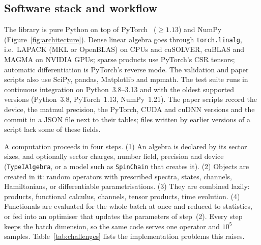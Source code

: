 \documentclass[11pt]{article}
\begin{document}
\subsection{Software stack and workflow}\label{sec:stack}

The library is pure Python on top of PyTorch~\cite{paszke2019} ($\ge1.13$) and NumPy~\cite{harris2020}
(Figure~\ref{fig:architecture}). Dense linear algebra goes through \texttt{torch.linalg}, i.e.\ LAPACK (MKL or
OpenBLAS) on CPUs and cuSOLVER, cuBLAS and MAGMA on NVIDIA GPUs; sparse products use PyTorch's CSR tensors; automatic
differentiation is PyTorch's reverse mode. The validation and paper scripts also use SciPy, pandas, Matplotlib and
mpmath. The test suite runs in continuous integration on Python~3.8--3.13 and with the oldest supported versions
(Python~3.8, PyTorch~1.13, NumPy~1.21). The paper scripts record the device, the matmul precision, the PyTorch, CUDA and
cuDNN versions and the commit in a JSON file next to their tables; files written by earlier versions of a script lack
some of these fields.

A computation proceeds in four steps. (1) An algebra is declared by its sector sizes, and optionally sector charges,
number field, precision and device (\texttt{TypeIAlgebra}, or a model such as \texttt{SpinChain} that creates it).
(2) Objects are created in it: random operators with prescribed spectra, states, channels, Hamiltonians, or
differentiable parametrisations. (3) They are combined lazily: products, functional calculus, channels, tensor products,
time evolution. (4) Functionals are evaluated for the whole batch at once and reduced to statistics, or fed into an
optimiser that updates the parameters of step~(2). Every step keeps the batch dimension, so the same code serves one
operator and $10^5$ samples. Table~\ref{tab:challenges} lists the implementation problems this raises.
\end{document}
